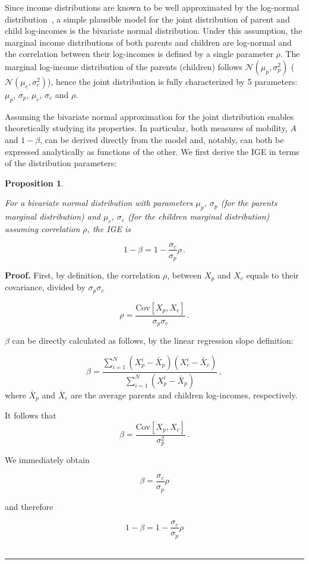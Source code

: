 \documentclass[prl,amsmath,twocolumn,nofootinbib]{revtex4}
\newcommand{\elabel}[1]{\label{eq:#1}}
\newcommand{\be}{\begin{equation}}
\newcommand{\ee}{\end{equation}}
\newtheorem{proposition}{Proposition}
\newenvironment{proof}[1][Proof]{\noindent\textbf{#1.} }{\ \rule{0.5em}{0.5em}}
\numberwithin{equation}{section}
\begin{document}
Since income distributions are known to be well approximated by the log-normal distribution~\cite{pinkovskiy2009parametric}, a simple plausible model for the joint distribution of parent and child log-incomes is the bivariate normal distribution. Under this assumption, the marginal income distributions of both parents and children are log-normal and the correlation between their log-incomes is defined by a single parameter $\rho$. The marginal log-income distribution of the parents (children) follows $\mathcal{N}\left(\mu_p,\sigma_p^2\right)$ ($\mathcal{N}\left(\mu_c,\sigma_c^2\right)$), hence the joint distribution is fully characterized by 5 parameters: $\mu_p$, $\sigma_p$, $\mu_c$, $\sigma_c$ and $\rho$.

Assuming the bivariate normal approximation for the joint distribution enables theoretically studying its properties. In particular, both measures of mobility, $A$ and $1-\beta$, can be derived directly from the model and, notably, can both be expressed analytically as functions of the other. We first derive the IGE in terms of the distribution parameters:

\begin{proposition}
\label{prop:prop1}

For a bivariate normal distribution with parameters $\mu_p$, $\sigma_p$ (for the parents marginal distribution) and $\mu_c$, $\sigma_c$ (for the children marginal distribution) assuming correlation $\rho$, the IGE is

\be
1-\beta = 1-\frac{\sigma_c}{\sigma_p}\rho \,.
\elabel{beta_rho}
\ee
\end{proposition}

\begin{proof}
First, by definition, the correlation $\rho$, between $X_p$ and $X_c$ equals to their covariance, divided by $\sigma_p\sigma_c$

\be
\rho = \frac{\text{Cov}\left[X_p,X_c\right]}{\sigma_p\sigma_c}\,.
\ee

$\beta$ can be directly calculated as follows, by the linear regression slope definition:

\be
\beta = \frac{\sum_{i=1}^{N} {\left(X_p^i - \bar{X}_p\right)\left(X_c^i - \bar{X}_c\right)}}{\sum_{i=1}^{N} {\left(X_p^i - \bar{X}_p\right)}}\,,
\ee
where $\bar{X}_p$ and $\bar{X}_c$ are the average parents and children log-incomes, respectively.

It follows that 
\be
\beta = \frac{\text{Cov}\left[X_p,X_c\right]}{\sigma_p^2}\,.
\ee

We immediately obtain

\be
\beta = \frac{\sigma_c}{\sigma_p}\rho
\ee

and therefore

\be
1-\beta = 1-\frac{\sigma_c}{\sigma_p}\rho
\ee
\end{proof}
\end{document}
